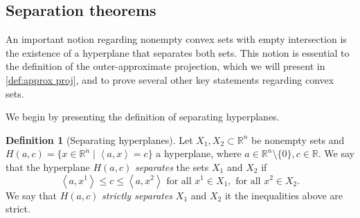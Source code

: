 \documentclass[smallextended,numbook,nospthms]{svjour3}
\theoremstyle{plain}
\newtheorem{fact}[theorem]{Fact}
\theoremstyle{definition}
\newtheorem{definition}[theorem]{Definition}
\def\RR{\mathds R}
\newcommand{\scal}[2]{\left\langle{#1},{#2}  \right\rangle}
\begin{document}

\subsection{Separation theorems}

An important notion regarding nonempty convex sets with empty intersection is the existence of a hyperplane that separates both sets. This notion is essential to the definition of the outer-approximate projection, which we will present in \cref{def:approx proj}, and to prove several other key statements regarding convex sets. 

We begin by presenting the definition of separating hyperplanes.

\begin{definition}[Separating hyperplanes]\label{def:sep hyperplane}
	Let $X_{1}, X_{2} \subset \RR^n$ be nonempty sets and $H(a,c)=\{x \in \RR^n \mid \scal{a}{x}=c\}$ a hyperplane, where $a \in \RR^n \setminus \{0\}, c \in \RR$.
	We say that the hyperplane $H(a,c)$ \emph{separates} the sets $X_{1}$ and $X_{2}$ if 
	\[
	\scal{a}{x^1} \leq c \leq \scal{a}{x^2} \text{ for all } x^1 \in X_1, \text{ for all } x^2 \in X_2.
	\]
	We say that $H(a,c)$ \emph{strictly separates} $X_1$ and $X_2$ it the inequalities above are strict.
\end{definition}
\end{document}
